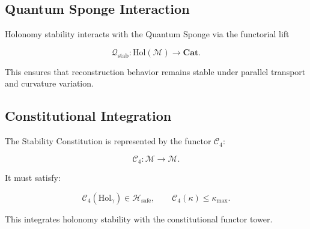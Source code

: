 
\subsection{Quantum Sponge Interaction}

Holonomy stability interacts with the Quantum Sponge via the functorial lift

\[
\mathcal{Q}_{\mathrm{stab}} :
\mathrm{Hol}(\mathcal{M}) \to \mathbf{Cat}.
\]

This ensures that reconstruction behavior remains stable under parallel
transport and curvature variation.


\subsection{Constitutional Integration}

The Stability Constitution is represented by the functor $\mathcal{C}_4$:

\[
\mathcal{C}_4 : \mathcal{M} \to \mathcal{M}.
\]

It must satisfy:

\[
\mathcal{C}_4(\mathrm{Hol}_\gamma) \in \mathcal{H}_{\mathrm{safe}},
\qquad
\mathcal{C}_4(\kappa) \le \kappa_{\max}.
\]

This integrates holonomy stability with the constitutional functor tower.

